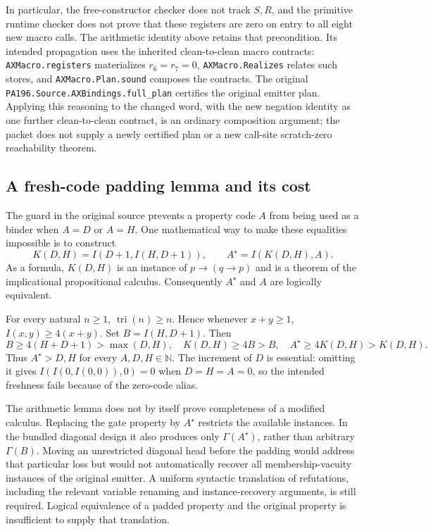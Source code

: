 In particular, the free-constructor checker does not track $S,R$, and
the primitive runtime checker does not prove that these registers are
zero on entry to all eight new macro calls.  The arithmetic identity
above retains that precondition.  Its intended propagation uses the
inherited clean-to-clean macro contracts: \texttt{AXMacro.registers}
materializes $r_6=r_7=0$, \texttt{AXMacro.Realizes} relates such stores,
and \texttt{AXMacro.Plan.sound} composes the contracts.  The original
\texttt{PA196.Source.AXBindings.full\_plan} certifies the original
emitter plan.  Applying this reasoning to the changed word, with the
new negation identity as one further clean-to-clean contract, is an
ordinary composition argument; the packet does not supply a newly
certified plan or a new call-site scratch-zero reachability theorem.

\subsection{A fresh-code padding lemma and its cost}

The guard in the original source prevents a property code $A$ from
being used as a binder when $A=D$ or $A=H$.  One mathematical way to
make these equalities impossible is to construct
\[
  K(D,H)=I(D+1,I(H,D+1)),\qquad
  A^\star=I(K(D,H),A).
\]
As a formula, $K(D,H)$ is an instance of
$p\mathbin{\to}(q\mathbin{\to}p)$ and is a theorem of the implicational
propositional calculus.  Consequently $A^\star$ and $A$ are logically
equivalent.

For every natural $n\geq1$, $\operatorname{tri}(n)\geq n$.  Hence whenever
$x+y\geq1$,
$I(x,y)\geq4(x+y)$.  Set $B=I(H,D+1)$.  Then
\[
 B\geq4(H+D+1)>\max(D,H),\quad
 K(D,H)\geq4B>B,\quad A^\star\geq4K(D,H)>K(D,H).
\]
Thus $A^\star>D,H$ for every $A,D,H\in\mathbb N$.
The increment of $D$ is essential: omitting it gives
$I(I(0,I(0,0)),0)=0$ when $D=H=A=0$, so the intended freshness fails
because of the zero-code alias.

The arithmetic lemma does not by itself prove completeness of a
modified calculus.  Replacing the gate property by $A^\star$ restricts
the available instances.  In the bundled diagonal design it also
produces only $\Gamma(A^\star)$, rather than arbitrary $\Gamma(B)$.
Moving an unrestricted diagonal head before the padding would address
that particular loss but would not automatically recover all
membership-vacuity instances of the original emitter.  A uniform
syntactic translation of refutations, including the relevant variable
renaming and instance-recovery arguments, is still required.
Logical equivalence of a padded property and the original property is
insufficient to supply that translation.

